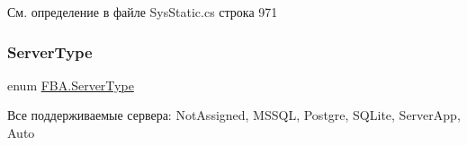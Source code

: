 См. определение в файле Sys\+Static.\+cs строка 971

\mbox{\label{namespace_f_b_a_a54b34d51226fe01d01f79d9fcb237413}} 
\subsubsection{\texorpdfstring{Server\+Type}{ServerType}}
{\footnotesize\ttfamily enum \mbox{\hyperlink{namespace_f_b_a_a54b34d51226fe01d01f79d9fcb237413}{F\+B\+A.\+Server\+Type}}\hspace{0.3cm}{\ttfamily [strong]}}



Все поддерживаемые сервера\+: Not\+Assigned, M\+S\+S\+QL, Postgre, S\+Q\+Lite, Server\+App, Auto 


